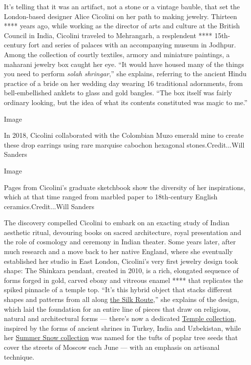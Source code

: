 It's telling that it was an artifact, not a stone or a vintage bauble,
that set the London-based designer Alice Cicolini on her path to making
jewelry. Thirteen **** years ago, while working as the director of arts
and culture at the British Council in India, Cicolini traveled to
Mehrangarh, a resplendent **** 15th-century fort and series of palaces
with an accompanying museum in Jodhpur. Among the collection of courtly
textiles, armory and miniature paintings, a maharani jewelry box caught
her eye. ``It would have housed many of the things you need to perform
\emph{solah shringar},'' she explains, referring to the ancient Hindu
practice of a bride on her wedding day wearing 16 traditional
adornments, from bell-embellished anklets to glass and gold bangles.
``The box itself was fairly ordinary looking, but the idea of what its
contents constituted was magic to me.''

Image

In 2018, Cicolini collaborated with the Colombian Muzo emerald mine to
create these drop earrings using rare marquise cabochon hexagonal
stones.Credit...Will Sanders

Image

Pages from Cicolini's graduate sketchbook show the diversity of her
inspirations, which at that time ranged from marbled paper to
18th-century English ceramics.Credit...Will Sanders

The discovery compelled Cicolini to embark on an exacting study of
Indian aesthetic ritual, devouring books on sacred architecture, royal
presentation and the role of cosmology and ceremony in Indian theater.
Some years later, after much research and a move back to her native
England, where she eventually established her studio in East London,
Cicolini's very first jewelry design took shape: The Shinkara pendant,
created in 2010, is a rich, elongated sequence of forms forged in gold,
carved ebony and vitreous enamel **** that replicates the spiked
pinnacle of a temple top. ``It's this hybrid object that stacks
different shapes and patterns from all along
\href{https://www.nytimes3xbfgragh.onion/2020/05/11/t-magazine/the-silk-road.html}{the
Silk Route},'' she explains of the design, which laid the foundation for
an entire line of pieces that draw on religious, natural and
architectural forms --- there's now a dedicated
\href{http://www.alicecicolini.com/index\#/temple}{Temple collection},
inspired by the forms of ancient shrines in Turkey, India and
Uzbekistan, while her
\href{http://www.alicecicolini.com/index\#/summer-snow-collcection}{Summer
Snow collection} was named for the tufts of poplar tree seeds that cover
the streets of Moscow each June --- with an emphasis on artisanal
technique.

